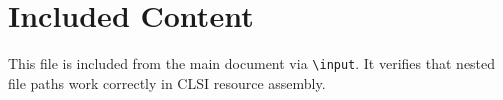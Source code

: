 \section{Included Content}

This file is included from the main document via \texttt{\textbackslash input}.
It verifies that nested file paths work correctly in CLSI resource assembly.
